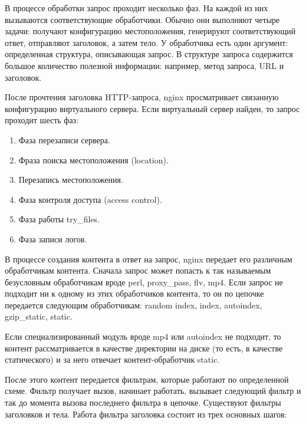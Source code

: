 \documentclass[14pt, a4paper]{article}
\begin{document}
В процессе обработки запрос проходит несколько фаз. На каждой из них вызываются соответствующие 
обработчики. Обычно они выполняют четыре задачи: получают конфигурацию местоположения, генерируют 
соответствующий ответ, отправляют заголовок, а затем тело. У обработчика есть один аргумент: 
определенная структура, описывающая запрос. В структуре запроса содержится большое количество 
полезной информации: например, метод запроса, URL и заголовок.

После прочтения заголовка HTTP-запроса, nginx просматривает связанную конфигурацию виртуального 
сервера. Если виртуальный сервер найден, то запрос проходит шесть фаз:

\begin{enumerate}
    \item Фаза перезаписи сервера.
    \item Фраза поиска местоположения (location).
    \item Перезапись местоположения.
    \item Фаза контроля доступа (access control).
    \item Фаза работы try\_files.
    \item Фаза записи логов.
\end{enumerate}
В процессе создания контента в ответ на запрос, nginx передает его различным обработчикам 
контента. Сначала запрос может попасть к так называемым безусловным обработчикам вроде 
perl, proxy\_pass, flv, mp4. Если запрос не подходит ни к одному из этих обработчиков контента, 
то он по цепочке передается следующим обработчикам: random index, index, autoindex, gzip\_static, static.

Если специализированный модуль вроде mp4 или autoindex не подходит, то контент рассматривается в качестве 
директории на диске (то есть, в качестве статического) и за него отвечает контент-обработчик static.

После этого контент передается фильтрам, которые работают по определенной схеме. Фильтр получает вызов, 
начинает работать, вызывает следующий фильтр и так до момента вызова последнего фильтра в цепочке. 
Существуют фильтры заголовков и тела. Работа фильтра заголовка состоит из трех основных шагов:
\end{document}

